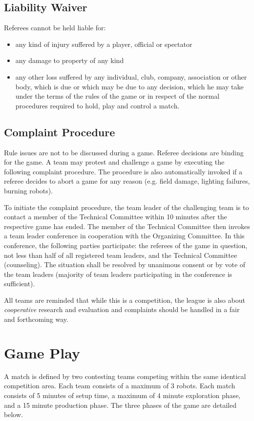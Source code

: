 \documentclass[12pt,twoside]{article}
\begin{document}
\subsection{Liability Waiver}
Referees cannot be held liable for:
\begin{itemize}
\item any kind of injury suffered by a player, official or spectator
\item any damage to property of any kind
\item any other loss suffered by any individual, club, company,
  association or other body, which is due or which may be due to any
  decision, which he may take under the terms of the rules of the game
  or in respect of the normal procedures required to hold, play and
  control a match.
\end{itemize}

\subsection{Complaint Procedure}
Rule issues are not to be discussed during a game. Referee decisions
are binding for the game. A team may protest and challenge a game by
executing the following complaint procedure. The procedure is also
automatically invoked if a referee decides to abort a game for any
reason (e.g. field damage, lighting failures, burning robots).

To initiate the complaint procedure, the team leader of the
challenging team is to contact a member of the Technical Committee
within 10 minutes after the respective game has ended. The member of
the Technical Committee then invokes a team leader conference in
cooperation with the Organizing Committee. In this conference, the
following parties participate: the referees of the game in question,
not less than half of all registered team leaders, and the Technical
Committee (counseling). The situation shall be resolved by unanimous
consent or by vote of the team leaders (majority of team leaders
participating in the conference is sufficient).

All teams are reminded that while this is a competition, the league is
also about \emph{cooperative} research and evaluation and complaints
should be handled in a fair and forthcoming way.

\section{Game Play}
A match is defined by two contesting teams competing within the same
identical competition area. Each team consists of a maximum of 3
robots. Each match consists of 5 minutes of setup time, a maximum of 4
minute exploration phase, and a 15 minute production phase.
The three phases of the game are detailed below.
\end{document}
